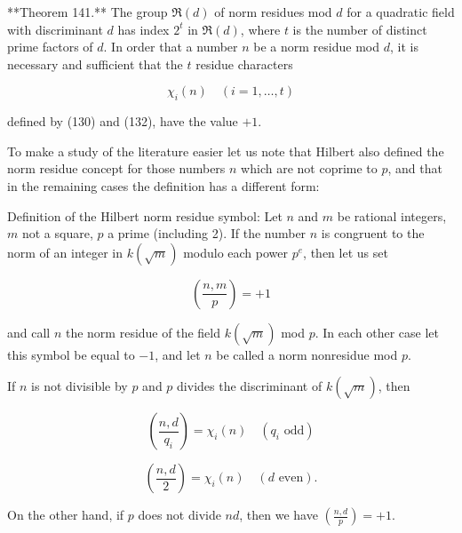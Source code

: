 **Theorem 141.** The group $\mathfrak{R}(d)$ of norm residues mod $d$ for a quadratic field with discriminant $d$ has index $2^t$ in $\mathfrak{R}(d)$, where $t$ is the number of distinct prime factors of $d$. In order that a number $n$ be a norm residue mod $d$, it is necessary and sufficient that the $t$ residue characters

$$\chi_i(n) \quad (i = 1, \ldots, t)$$

defined by (130) and (132), have the value $+1$.

To make a study of the literature easier let us note that Hilbert also defined the norm residue concept for those numbers $n$ which are not coprime to $p$, and that in the remaining cases the definition has a different form:

Definition of the Hilbert norm residue symbol: Let $n$ and $m$ be rational integers, $m$ not a square, $p$ a prime (including 2). If the number $n$ is congruent to the norm of an integer in $k(\sqrt{m})$ modulo each power $p^e$, then let us set

$$\left(\frac{n, m}{p}\right) = +1$$

and call $n$ the norm residue of the field $k(\sqrt{m})$ mod $p$. In each other case let this symbol be equal to $-1$, and let $n$ be called a norm nonresidue mod $p$.

If $n$ is not divisible by $p$ and $p$ divides the discriminant of $k(\sqrt{m})$, then

$$\left(\frac{n, d}{q_i}\right) = \chi_i(n) \quad (q_i \text{ odd})$$

$$\left(\frac{n, d}{2}\right) = \chi_i(n) \quad (d \text{ even}).$$

On the other hand, if $p$ does not divide $nd$, then we have $\left(\frac{n, d}{p}\right) = +1$.
